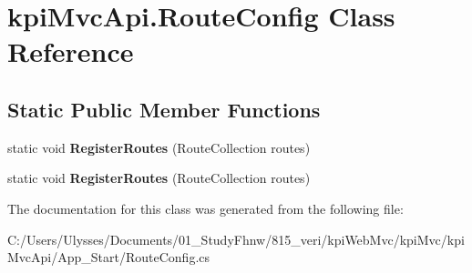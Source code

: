 \hypertarget{classkpi_mvc_api_1_1_route_config}{}\section{kpi\+Mvc\+Api.\+Route\+Config Class Reference}
\label{classkpi_mvc_api_1_1_route_config}
\subsection*{Static Public Member Functions}
\begin{DoxyCompactItemize}
\item 
\mbox{\label{classkpi_mvc_api_1_1_route_config_a7695727c1d42e9d813eb3c0c63802ec3}} 
static void {\bfseries Register\+Routes} (Route\+Collection routes)
\item 
\mbox{\label{classkpi_mvc_api_1_1_route_config_a7695727c1d42e9d813eb3c0c63802ec3}} 
static void {\bfseries Register\+Routes} (Route\+Collection routes)
\end{DoxyCompactItemize}


The documentation for this class was generated from the following file\+:\begin{DoxyCompactItemize}
\item 
C\+:/\+Users/\+Ulysses/\+Documents/01\+\_\+\+Study\+Fhnw/815\+\_\+veri/kpi\+Web\+Mvc/kpi\+Mvc/kpi\+Mvc\+Api/\+App\+\_\+\+Start/Route\+Config.\+cs\end{DoxyCompactItemize}
